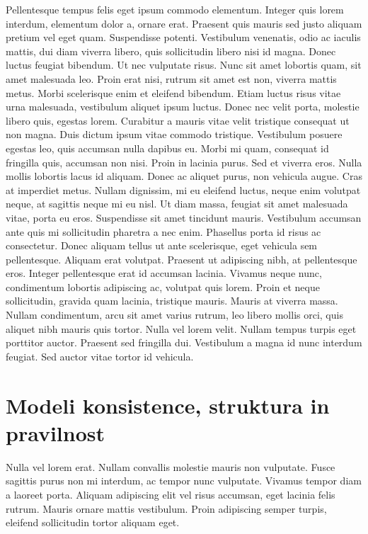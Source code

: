 \documentclass[a4paper, 12pt, twoside]{book}
\begin{document}
Pellentesque tempus felis eget ipsum commodo elementum. Integer quis lorem interdum, elementum dolor a, ornare erat. Praesent quis mauris sed justo aliquam pretium vel eget quam. Suspendisse potenti. Vestibulum venenatis, odio ac iaculis mattis, dui diam viverra libero, quis sollicitudin libero nisi id magna. Donec luctus feugiat bibendum. Ut nec vulputate risus. Nunc sit amet lobortis quam, sit amet malesuada leo. Proin erat nisi, rutrum sit amet est non, viverra mattis metus. Morbi scelerisque enim et eleifend bibendum. Etiam luctus risus vitae urna malesuada, vestibulum aliquet ipsum luctus. Donec nec velit porta, molestie libero quis, egestas lorem. Curabitur a mauris vitae velit tristique consequat ut non magna. Duis dictum ipsum vitae commodo tristique. Vestibulum posuere egestas leo, quis accumsan nulla dapibus eu. Morbi mi quam, consequat id fringilla quis, accumsan non nisi. Proin in lacinia purus. Sed et viverra eros. Nulla mollis lobortis lacus id aliquam. Donec ac aliquet purus, non vehicula augue. Cras at imperdiet metus. Nullam dignissim, mi eu eleifend luctus, neque enim volutpat neque, at sagittis neque mi eu nisl. Ut diam massa, feugiat sit amet malesuada vitae, porta eu eros. Suspendisse sit amet tincidunt mauris. Vestibulum accumsan ante quis mi sollicitudin pharetra a nec enim. Phasellus porta id risus ac consectetur. Donec aliquam tellus ut ante scelerisque, eget vehicula sem pellentesque. Aliquam erat volutpat. Praesent ut adipiscing nibh, at pellentesque eros. Integer pellentesque erat id accumsan lacinia. Vivamus neque nunc, condimentum lobortis adipiscing ac, volutpat quis lorem. Proin et neque sollicitudin, gravida quam lacinia, tristique mauris. Mauris at viverra massa. Nullam condimentum, arcu sit amet varius rutrum, leo libero mollis orci, quis aliquet nibh mauris quis tortor. Nulla vel lorem velit. Nullam tempus turpis eget porttitor auctor. Praesent sed fringilla dui. Vestibulum a magna id nunc interdum feugiat. Sed auctor vitae tortor id vehicula.

\chapter{Modeli konsistence, struktura in pravilnost}

Nulla vel lorem erat. Nullam convallis molestie mauris non vulputate. Fusce sagittis purus non mi interdum, ac tempor nunc vulputate. Vivamus tempor diam a laoreet porta. Aliquam adipiscing elit vel risus accumsan, eget lacinia felis rutrum. Mauris ornare mattis vestibulum. Proin adipiscing semper turpis, eleifend sollicitudin tortor aliquam eget.
\end{document}
